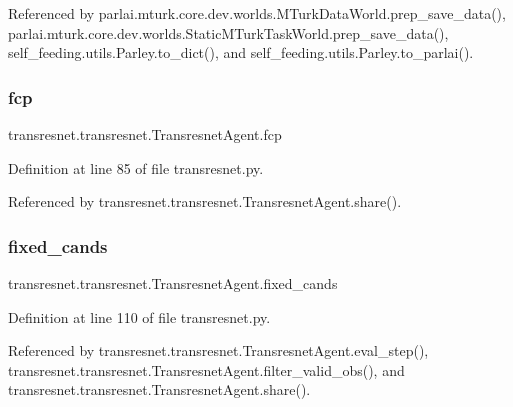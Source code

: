 Referenced by parlai.\+mturk.\+core.\+dev.\+worlds.\+M\+Turk\+Data\+World.\+prep\+\_\+save\+\_\+data(), parlai.\+mturk.\+core.\+dev.\+worlds.\+Static\+M\+Turk\+Task\+World.\+prep\+\_\+save\+\_\+data(), self\+\_\+feeding.\+utils.\+Parley.\+to\+\_\+dict(), and self\+\_\+feeding.\+utils.\+Parley.\+to\+\_\+parlai().

\mbox{\label{classtransresnet_1_1transresnet_1_1TransresnetAgent_a4403985be9a3e072a3499fb1916bafe1}} 
\subsubsection{\texorpdfstring{fcp}{fcp}}
{\footnotesize\ttfamily transresnet.\+transresnet.\+Transresnet\+Agent.\+fcp}



Definition at line 85 of file transresnet.\+py.



Referenced by transresnet.\+transresnet.\+Transresnet\+Agent.\+share().

\mbox{\label{classtransresnet_1_1transresnet_1_1TransresnetAgent_ae1c8b1b18d0bb9d0c9541dcfdceef831}} 
\subsubsection{\texorpdfstring{fixed\+\_\+cands}{fixed\_cands}}
{\footnotesize\ttfamily transresnet.\+transresnet.\+Transresnet\+Agent.\+fixed\+\_\+cands}



Definition at line 110 of file transresnet.\+py.



Referenced by transresnet.\+transresnet.\+Transresnet\+Agent.\+eval\+\_\+step(), transresnet.\+transresnet.\+Transresnet\+Agent.\+filter\+\_\+valid\+\_\+obs(), and transresnet.\+transresnet.\+Transresnet\+Agent.\+share().

